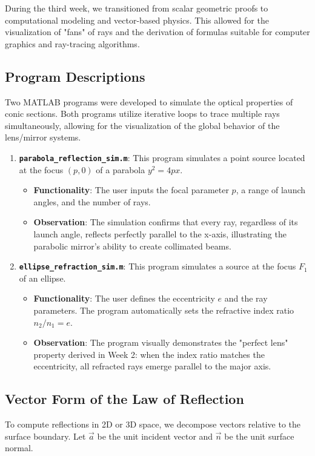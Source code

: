 \documentclass{article}
\begin{document}
During the third week, we transitioned from scalar geometric proofs to computational modeling and vector-based physics. This allowed for the visualization of "fans" of rays and the derivation of formulas suitable for computer graphics and ray-tracing algorithms.

\subsection{Program Descriptions}
Two MATLAB programs were developed to simulate the optical properties of conic sections. Both programs utilize iterative loops to trace multiple rays simultaneously, allowing for the visualization of the global behavior of the lens/mirror systems.

\begin{enumerate}
    \item \textbf{\texttt{parabola\_reflection\_sim.m}}: This program simulates a point source located at the focus $(p, 0)$ of a parabola $y^2 = 4px$. 
    \begin{itemize}
        \item \textbf{Functionality}: The user inputs the focal parameter $p$, a range of launch angles, and the number of rays. 
        \item \textbf{Observation}: The simulation confirms that every ray, regardless of its launch angle, reflects perfectly parallel to the x-axis, illustrating the parabolic mirror's ability to create collimated beams.
    \end{itemize}
    
    \item \textbf{\texttt{ellipse\_refraction\_sim.m}}: This program simulates a source at the focus $F_1$ of an ellipse.
    \begin{itemize}
        \item \textbf{Functionality}: The user defines the eccentricity $e$ and the ray parameters. The program automatically sets the refractive index ratio $n_2/n_1 = e$.
        \item \textbf{Observation}: The program visually demonstrates the "perfect lens" property derived in Week 2: when the index ratio matches the eccentricity, all refracted rays emerge parallel to the major axis.
    \end{itemize}
\end{enumerate}

\subsection{Vector Form of the Law of Reflection}
To compute reflections in 2D or 3D space, we decompose vectors relative to the surface boundary. Let $\vec{a}$ be the unit incident vector and $\vec{n}$ be the unit surface normal.
\end{document}
